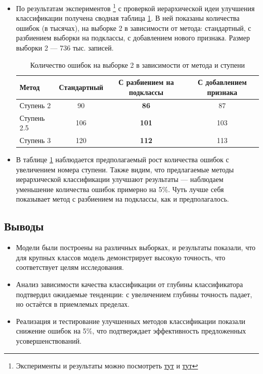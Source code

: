 \documentclass{article}
\begin{document}
\begin{itemize}
    \item По результатам экспериментов \footnote{Эксперименты и результаты можно посмотреть \href{https://github.com/intsystems/2024-Project-142/blob/master/code/0_try_ierarhik.ipynb}{тут} и \href{https://github.com/intsystems/2024-Project-142/blob/master/code/0_try_ierarhik.ipynb}{тут}} с проверкой иерархической идеи улучшения классификации получена сводная таблица \ref{tab:1}. В ней показаны количества ошибок (в тысячах), на выборке 2 в зависимости от метода: стандартный, с разбиением выборки на подклассы, с добавлением нового признака. Размер выборки 2 --- 736 тыс. записей.
    
    \begin{table}[ht]
        \centering
        \begin{tabular}{|l|c|c|c|}
            \hline
            \textbf{Метод} & \textbf{Стандартный} & \textbf{С разбиением на подклассы} & \textbf{С добавлением признака} \\ \hline
            Ступень 2 & 90 & \textbf{86} & 87 \\ \hline
            Ступень 2.5 & 106 & \textbf{101} & 103 \\ \hline
            Ступень 3 & 120 & \textbf{112} & 113 \\ \hline
        \end{tabular}
        \caption{Количество ошибок на выборке 2 в зависимости от метода и ступени}
        \label{tab:1}
    \end{table}
    
    \item В таблице \ref{tab:1} наблюдается предполагаемый рост количества ошибок с увеличением номера ступени. Также видим, что предлагаемые методы иерархической классификации улучшают результаты --- наблюдаем уменьшение количества ошибок примерно на 5\%. Чуть лучше себя показывает метод с разбиением на подклассы, как и предполагалось. 
\end{itemize}


\subsection{Выводы}
\begin{itemize}
    \item Модели были построены на различных выборках, и результаты показали, что для крупных классов модель демонстрирует высокую точность, что соответствует целям исследования.
    \item Анализ зависимости качества классификации от глубины классификатора подтвердил ожидаемые тенденции: с увеличением глубины точность падает, но остаётся в приемлемых пределах.
    \item Реализация и тестирование улучшенных методов классификации показали снижение ошибок на 5\%, что подтверждает эффективность предложенных усовершенствований.
\end{itemize}
\end{document}
